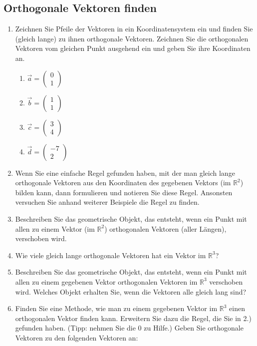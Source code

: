 \documentclass[12pt,a4paper,twoside,fleqn]{article}
\begin{document}
\subsection{Orthogonale Vektoren finden}
\begin{enumerate}
\item Zeichnen Sie Pfeile der Vektoren in ein Koordinatensystem ein und
  finden Sie (gleich lange) zu ihnen orthogonale Vektoren. Zeichnen
  Sie die orthogonalen Vektoren vom gleichen Punkt ausgehend ein und
  geben Sie ihre Koordinaten an. 

  \begin{multicols}{4}
    \begin{enumerate}
    \item $\vec{a}=  
      \begin{pmatrix}
        0\\1
      \end{pmatrix}
      $
    \item $\vec{b}=  
      \begin{pmatrix}
        1\\1
      \end{pmatrix}
      $
    \item $\vec{c}=  
      \begin{pmatrix}
        3\\4
      \end{pmatrix}
      $
    \item $\vec{d}=  
      \begin{pmatrix}
        -7\\2
      \end{pmatrix}
      $
    \end{enumerate}
  \end{multicols}
\item Wenn Sie eine einfache Regel gefunden haben, mit der man gleich lange
  orthogonale Vektoren aus den Koordinaten des gegebenen Vektors  (im
  $\mathbb{R}^2$) bilden
  kann, dann formulieren und notieren Sie diese
  Regel. Ansonsten  versuchen Sie anhand weiterer Beispiele die Regel zu
  finden.
\item Beschreiben Sie das geometrische Objekt, das entsteht, wenn ein
  Punkt mit allen zu einem Vektor (im $\mathbb{R}^2$)  orthogonalen
  Vektoren (aller Längen), verschoben wird. 
\item Wie viele gleich
  lange orthogonale Vektoren hat ein Vektor im $\mathbb{R}^3$?
\item Beschreiben Sie das geometrische Objekt, das entsteht, wenn ein
  Punkt mit allen zu einem gegebenen Vektor orthogonalen Vektoren im
  $\mathbb{R}^3$ verschoben wird. Welches Objekt erhalten Sie, wenn
  die Vektoren alle gleich lang sind?
\item Finden Sie eine Methode, wie man zu einem gegebenen Vektor im
  $\mathbb{R}^3$ einen orthogonalen Vektor finden kann. Erweitern Sie
  dazu die Regel, die Sie in 2.) gefunden haben. (Tipp: nehmen Sie die
  0 zu Hilfe.) Geben Sie orthogonale Vektoren zu den folgenden
  Vektoren an:
  

\end{enumerate}
\end{document}
